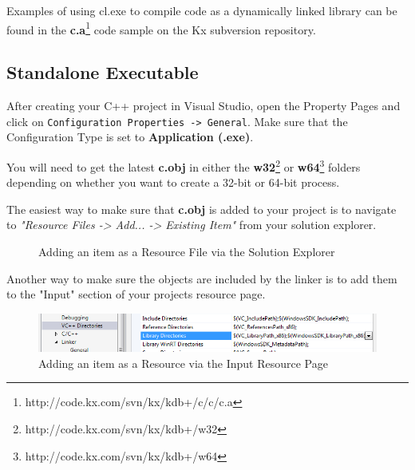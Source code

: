  Examples of using cl.exe to compile code as a dynamically linked library can be found in the
 \textbf{c.a}\footnote{http://code.kx.com/svn/kx/kdb+/c/c/c.a} code sample on the Kx subversion repository.
 
 \subsection{Standalone Executable}
 
 After creating your C++ project in Visual Studio, open the Property Pages and click on \verb|Configuration Properties -> General|. Make sure that the Configuration Type is set to \textbf{Application (.exe)}.
 
 You will need to get the latest \textbf{c.obj} in either the \textbf{w32}\footnote{http://code.kx.com/svn/kx/kdb+/w32} or \textbf{w64}\footnote{http://code.kx.com/svn/kx/kdb+/w64} folders depending on whether you want to create a 32-bit or 64-bit process.
 
The easiest way to make sure that \textbf{c.obj} is added to your project is to navigate to \textit{"Resource Files -> Add... -> Existing Item"} from your solution explorer.
 
 \begin{figure}[H]
 	\centering
 	\caption{Adding an item as a Resource File via the Solution Explorer}
 	\label{addingvsresource}
 \end{figure}
 
 Another way to make sure the objects are included by the linker is to add them to the "Input"
 section of your projects resource page.
 
 \begin{figure}[H]
 	\centering
 	\includegraphics[scale=0.50]{figures/windows_vs2012_static_linking_dirs.png}
 	\caption{Adding an item as a Resource via the Input Resource Page}
 	\label{usingtheinputresourcepage}
 \end{figure}
 
